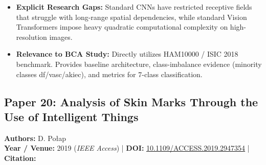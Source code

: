 \documentclass[11pt,a4paper]{article}
\begin{document}
\begin{itemize}
\item \textbf{Explicit Research Gaps:} Standard CNNs have restricted receptive fields that struggle with long-range spatial dependencies, while standard Vision Transformers impose heavy quadratic computational complexity on high-resolution images.
\item \textbf{Relevance to BCA Study:} Directly utilizes HAM10000 / ISIC 2018 benchmark. Provides baseline architecture, class-imbalance evidence (minority classes df/vasc/akiec), and metrics for 7-class classification.
\end{itemize}

\subsection{Paper 20: Analysis of Skin Marks Through the Use of Intelligent Things}
\textbf{Authors:} D. Połap \\
\textbf{Year / Venue:} 2019 (\textit{IEEE Access}) | \textbf{DOI:} \href{https://doi.org/10.1109/ACCESS.2019.2947354}{10.1109/ACCESS.2019.2947354} | \textbf{Citation:} \cite{8868149}
\end{document}
